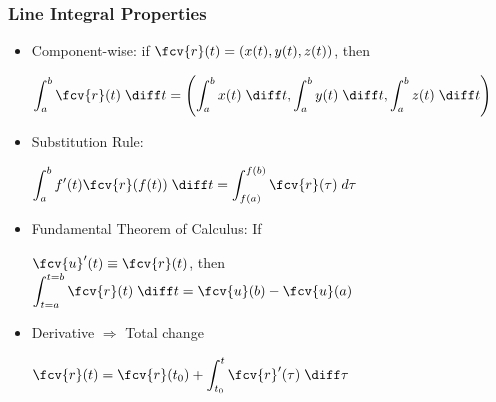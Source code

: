 \begin{frame}
\frametitle{Line Integral Properties}
\begin{itemize}
\item<1-> Component-wise: if $\fcv{r}(t) = ( x(t), y(t), z(t) )$, then

$\displaystyle \int_{a}^{b} \fcv{r}(t) \; \diff t = \left( \int_{a}^{b} x(t) \; \diff t, \int_{a}^{b} y(t) \; \diff t,\int_{a}^{b} z(t) \; \diff t \right)$

\item<2-> Substitution Rule:

$\displaystyle\int_{a}^b f'(t) \fcv{r}(f(t)) \; \diff t = \int_{f(a)}^{f(b)} \fcv{r}(\tau) \; d\tau$
\item<3-> Fundamental Theorem of Calculus: If

$\displaystyle\fcv{u}'(t)\equiv \fcv{r}(t)$, then $\displaystyle\int_{t=a}^{t=b} \fcv{r}(t) \; \diff t = \fcv{u}(b) - \fcv{u}(a)$
\item<4-> Derivative $\Longrightarrow$ Total change

$\displaystyle\fcv{r}(t) = \fcv{r}(t_0) + \int_{t_0}^t \fcv{r}'(\tau) \; \diff \tau$
\end{itemize}
\end{frame}
